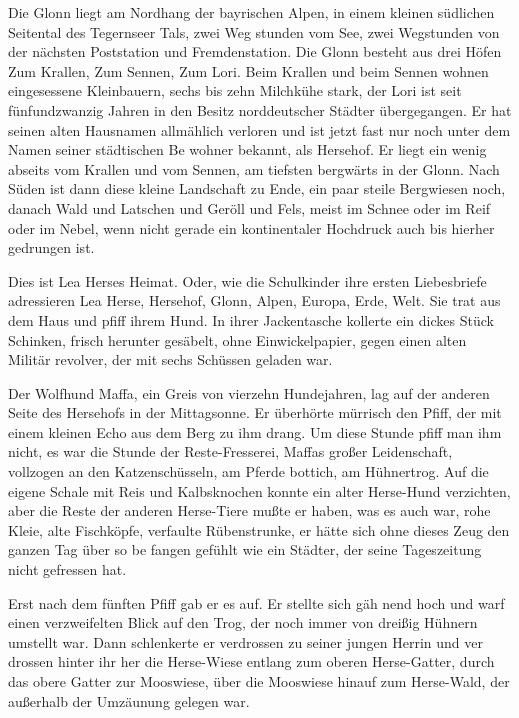 Die Glonn liegt am Nordhang der bayrischen Alpen, in einem
kleinen südlichen Seitental des Tegernseer Tals, zwei Weg\-%
stunden vom See, zwei Wegstunden von der nächsten Post\-station
und Fremdenstation. Die Glonn besteht aus drei
Höfen\dopp{} Zum Krallen, Zum Sennen, Zum Lori. Beim Krallen
und beim Sennen wohnen eingesessene Kleinbauern, sechs
bis zehn Milchkühe stark, der Lori ist seit fünfundzwanzig
Jahren in den Besitz norddeutscher Städter übergegangen.
Er hat seinen alten Hausnamen allmählich verloren und ist
jetzt fast nur noch unter dem Namen seiner städtischen Be\-%
wohner bekannt, als Hersehof. Er liegt ein wenig abseits vom
Krallen und vom Sennen, am tiefsten bergwärts in der
Glonn. Nach Süden ist dann diese kleine Landschaft zu Ende,
ein paar steile Bergwiesen noch, danach Wald und Latschen
und Geröll und Fels, meist im Schnee oder im Reif oder im
Nebel, wenn nicht gerade ein kontinentaler Hochdruck auch bis
hierher gedrungen ist.

Dies ist Lea Herses Heimat. Oder, wie die Schulkinder ihre
ersten Liebesbriefe adressieren\dopp{} Lea Herse, Hersehof, Glonn,
Alpen, Europa, Erde, Welt.
\abstand
Sie trat aus dem Haus und pfiff ihrem Hund. In ihrer
Jackentasche kollerte ein dickes Stück Schinken, frisch herunter\-%
gesäbelt, ohne Einwickelpapier, gegen einen alten Militär\-%
revolver, der mit sechs Schüssen geladen war.

Der Wolfhund Maffa, ein Greis von vierzehn Hundejahren,
lag auf der anderen Seite des Hersehofs in der Mittagsonne.
Er überhörte mürrisch den Pfiff, der mit einem kleinen Echo
aus dem Berg zu ihm drang. Um diese Stunde pfiff man ihm
nicht, es war die Stunde der Reste-Fresserei, Maffas großer
Leidenschaft, vollzogen an den Katzenschüsseln, am Pferde\-%
bottich, am Hühnertrog. Auf die eigene Schale mit Reis und
Kalbsknochen konnte ein alter Herse-Hund verzichten, aber
die Reste der anderen Herse-Tiere mußte er haben, was es
auch war, rohe Kleie, alte Fischköpfe, verfaulte Rübenstrunke,
er hätte sich ohne dieses Zeug den ganzen Tag über so be\-%
fangen gefühlt wie ein Städter, der seine Tageszeitung nicht
gefressen hat.

Erst nach dem fünften Pfiff gab er es auf. Er stellte sich gäh\-%
nend hoch und warf einen verzweifelten Blick auf den Trog,
der noch immer von dreißig Hühnern umstellt war. Dann
schlenkerte er verdrossen zu seiner jungen Herrin und ver\-%
drossen hinter ihr her\dopp{} die Herse-Wiese entlang zum oberen
Herse-Gatter, durch das obere Gatter zur Mooswiese, über
die Mooswiese hinauf zum Herse-Wald, der außerhalb der
Umzäunung gelegen war.


